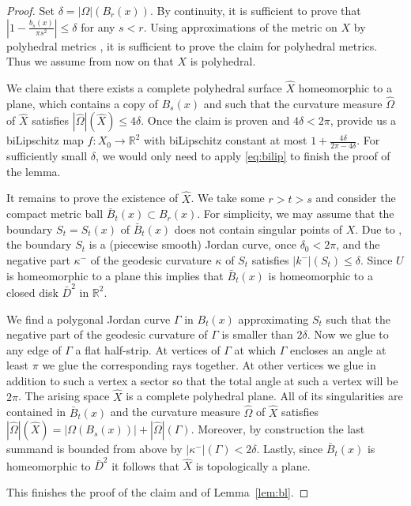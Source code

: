 \documentclass[12pt,leqno]{amsart}
\numberwithin{equation}{section}
\theoremstyle{definition}
\theoremstyle{remark}
\newcommand{\lref}[1]{Lemma~\ref{#1}}
\newcommand{\R}{\mathbb{R}}
\begin{document}
\begin{proof}
Set $\delta = |\Omega |( B_{r} (x))$. By continuity, it is sufficient to prove that $|1- \frac {b_s(x)}  {\pi s^2}| \leq \delta $ for any $s<r$.  Using approximations of
the metric on $X$ by polyhedral metrics \cite[Theorem 8.4.3, Theorem 8.1.9]{Reshetnyak-GeomIV},  it is sufficient to prove the claim  for polyhedral metrics. Thus we assume from now on that $X$ is polyhedral.

We claim  that there exists a complete polyhedral surface $\hat X$ homeomorphic to a plane,  which contains a copy of $B_s (x)$ and such that
the curvature measure $\hat \Omega$ of $\hat X$  satisfies $|\hat \Omega | (\hat X) \leq 4\delta$.  Once the claim is proven  and $4\delta < 2\pi$,
\cite{Bonk-Lang} provide us a biLipschitz map $f:X_0\to \R^2$ with biLipschitz constant at most $1+\frac {4\delta} {2\pi -4\delta}$.
For sufficiently small $\delta$, we would only need to apply \eqref{eq:bilip} to finish the proof of the lemma.

It remains to prove the existence of $\hat X$. We take some $r>t>s$ and consider the compact  metric ball $\bar B_t (x) \subset B_r (x)$. For simplicity, we may assume that  the boundary $S_t=S_t (x)$ of
$\bar B_t (x)$ does not contain singular points of $X$. Due to \cite[Theorem 9.1, Theorem 9.3] {Reshetnyak-GeomIV}, the boundary $S_t$ is a (piecewise smooth) Jordan curve, once $\delta _0< 2\pi$, and the negative part $\kappa ^-$ of the geodesic curvature $\kappa$ of $S_t$  satisfies $|k^-| (S_t)  \leq \delta$.  Since $U$ is homeomorphic to a plane this implies that $\bar B_t (x)$ is homeomorphic to a closed disk $\bar D^2$ in $\R^2$.


We find a polygonal Jordan curve $\Gamma$ in $B_t(x)$  approximating $S_t$  such that the negative part of the geodesic curvature of $\Gamma$ is smaller than $2\delta$.
Now we glue to any edge of $\Gamma$ a flat half-strip.   At vertices of $\Gamma$ at which $\Gamma$ encloses an angle at least $\pi$ we glue the corresponding rays together.   At other vertices we glue in addition to such a vertex a sector so that the total angle at such a vertex will be $2\pi$.  The arising space $\hat X$  is a complete polyhedral plane. All of its singularities are contained in $\bar B_t(x)$  and the curvature measure $\hat \Omega$  of $\hat X$ satisfies $|\hat \Omega | ( \hat X) = |\Omega (B_s (x))| + |\hat \Omega | ( \Gamma )$. Moreover, by construction  the last summand is bounded from above by $|\kappa ^-| (\Gamma )<2\delta$.
Lastly, since  $\bar B_t (x)$ is homeomorphic to $\bar D^2$ it follows that $\hat X$ is topologically a plane.

   This finishes the proof of the claim and of \lref{lem:bl}.
\end{proof}
\end{document}
